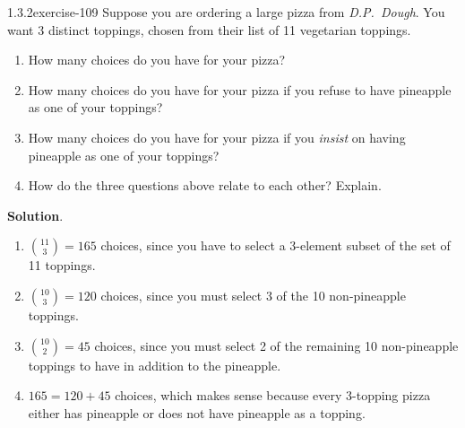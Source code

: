 \documentclass[twoside,11pt,]{book}
\numberwithin{equation}{chapter}
\begin{document}
\begin{divisionsolution}{1.3.2}{}{exercise-109}%
\hypertarget{p-1805}{}%
Suppose you are ordering a large pizza from \emph{D.P.~Dough}. You want 3 distinct toppings, chosen from their list of 11 vegetarian toppings.\leavevmode%
\begin{enumerate}[label=(\alph*)]
\item\hypertarget{li-1220}{}\hypertarget{p-1806}{}%
How many choices do you have for your pizza?%
\item\hypertarget{li-1221}{}\hypertarget{p-1808}{}%
How many choices do you have for your pizza if you refuse to have pineapple as one of your toppings?%
\item\hypertarget{li-1222}{}\hypertarget{p-1810}{}%
How many choices do you have for your pizza if you \emph{insist} on having pineapple as one of your toppings?%
\item\hypertarget{li-1223}{}\hypertarget{p-1812}{}%
How do the three questions above relate to each other? Explain.%
\end{enumerate}
%
\par\smallskip%
\noindent\textbf{Solution}.\quad%
\hypertarget{p-1813}{}%
\leavevmode%
\begin{enumerate}[label=(\alph*)]
\item\hypertarget{li-1224}{}\hypertarget{p-1814}{}%
\({11 \choose 3} = 165\) choices, since you have to select a 3-element subset of the set of 11 toppings.%
\item\hypertarget{li-1225}{}\hypertarget{p-1815}{}%
\({10 \choose 3} = 120\) choices, since you must select 3 of the 10 non-pineapple toppings.%
\item\hypertarget{li-1226}{}\hypertarget{p-1816}{}%
\({10 \choose 2} = 45\) choices, since you must select 2 of the remaining 10 non-pineapple toppings to have in addition to the pineapple.%
\item\hypertarget{li-1227}{}\hypertarget{p-1817}{}%
\(165 = 120 + 45\) choices, which makes sense because every 3-topping pizza either has pineapple or does not have pineapple as a topping.%
\end{enumerate}
%
\end{divisionsolution}%
\end{document}
